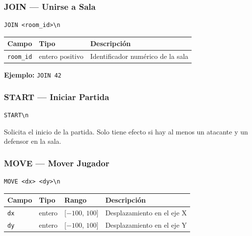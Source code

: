 \documentclass[12pt, letterpaper]{article}
\begin{document}
\subsubsection{JOIN --- Unirse a Sala}

\begin{lstlisting}
JOIN <room_id>\n
\end{lstlisting}

\begin{table}[H]
\centering
\begin{tabularx}{\textwidth}{l l X}
\toprule
\textbf{Campo} & \textbf{Tipo} & \textbf{Descripción} \\
\midrule
\texttt{room\_id} & entero positivo & Identificador numérico de la sala \\
\bottomrule
\end{tabularx}
\end{table}

\textbf{Ejemplo:} \texttt{JOIN 42}

\subsubsection{START --- Iniciar Partida}

\begin{lstlisting}
START\n
\end{lstlisting}

Solicita el inicio de la partida. Solo tiene efecto si hay al menos un atacante y un defensor en la sala.

\subsubsection{MOVE --- Mover Jugador}

\begin{lstlisting}
MOVE <dx> <dy>\n
\end{lstlisting}

\begin{table}[H]
\centering
\begin{tabularx}{\textwidth}{l l l X}
\toprule
\textbf{Campo} & \textbf{Tipo} & \textbf{Rango} & \textbf{Descripción} \\
\midrule
\texttt{dx} & entero & {[}$-100$, $100${]} & Desplazamiento en el eje X \\
\texttt{dy} & entero & {[}$-100$, $100${]} & Desplazamiento en el eje Y \\
\bottomrule
\end{tabularx}
\end{table}
\end{document}
